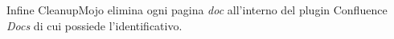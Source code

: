 Infine CleanupMojo elimina ogni pagina \emph{doc} all'interno del plugin Confluence \emph{Docs} di cui possiede l'identificativo.










